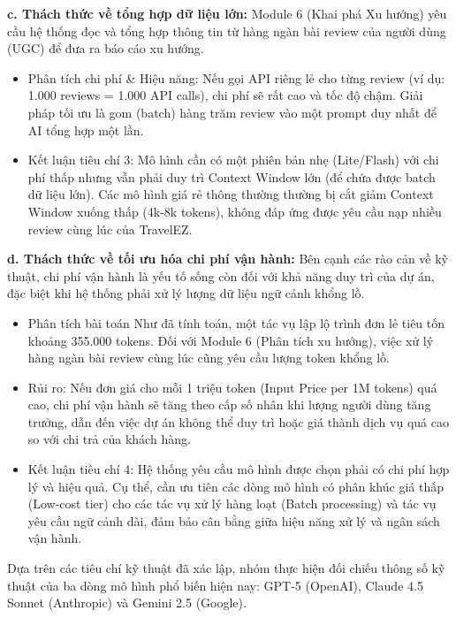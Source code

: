 \textbf{c. Thách thức về tổng hợp dữ liệu lớn:} Module 6 (Khai phá Xu hướng) yêu cầu hệ thống đọc và tổng hợp thông tin từ hàng ngàn bài review của người dùng (UGC) để đưa ra báo cáo xu hướng.

\begin{itemize}
    \item Phân tích chi phí \& Hiệu năng: Nếu gọi API riêng lẻ cho từng review (ví dụ: 1.000 reviews = 1.000 API calls), chi phí sẽ rất cao và tốc độ chậm. Giải pháp tối ưu là gom (batch) hàng trăm review vào một prompt duy nhất để AI tổng hợp một lần.
    \item Kết luận tiêu chí 3: Mô hình cần có một phiên bản nhẹ (Lite/Flash) với chi phí thấp nhưng vẫn phải duy trì Context Window lớn (để chứa được batch dữ liệu lớn). Các mô hình giá rẻ thông thường thường bị cắt giảm Context Window xuống thấp (4k-8k tokens), không đáp ứng được yêu cầu nạp nhiều review cùng lúc của TravelEZ.
\end{itemize}


\textbf{d. Thách thức về tối ưu hóa chi phí vận hành:} Bên cạnh các rào cản về kỹ thuật, chi phí vận hành là yếu tố sống còn đối với khả năng duy trì của dự án, đặc biệt khi hệ thống phải xử lý lượng dữ liệu ngữ cảnh khổng lồ.

\begin{itemize}
    \item Phân tích bài toán Như đã tính toán, một tác vụ lập lộ trình đơn lẻ tiêu tốn khoảng 355.000 tokens. Đối với Module 6 (Phân tích xu hướng), việc xử lý hàng ngàn bài review cùng lúc cũng yêu cầu lượng token khổng lồ.
    \item Rủi ro: Nếu đơn giá cho mỗi 1 triệu token (Input Price per 1M tokens) quá cao, chi phí vận hành sẽ tăng theo cấp số nhân khi lượng người dùng tăng trưởng, dẫn đến việc dự án không thể duy trì hoặc giá thành dịch vụ quá cao so với chi trả của khách hàng.
    \item Kết luận tiêu chí 4: Hệ thống yêu cầu mô hình được chọn phải có chi phí hợp lý và hiệu quả. Cụ thể, cần ưu tiên các dòng mô hình có phân khúc giá thấp (Low-cost tier) cho các tác vụ xử lý hàng loạt (Batch processing) và tác vụ yêu cầu ngữ cảnh dài, đảm bảo cân bằng giữa hiệu năng xử lý và ngân sách vận hành.
\end{itemize}


Dựa trên các tiêu chí kỹ thuật đã xác lập, nhóm thực hiện đối chiếu thông số kỹ thuật của ba dòng mô hình phổ biến hiện nay: GPT-5 (OpenAI), Claude 4.5 Sonnet (Anthropic) và Gemini 2.5 (Google).

